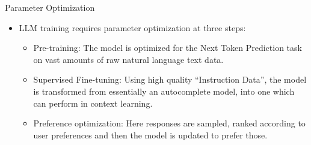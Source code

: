 \documentclass{beamer}
\begin{document}
\begin{frame}{Parameter Optimization}
    \begin{itemize}
        \item LLM training requires parameter optimization at three steps:
        \vspace{0.5em}
        \begin{itemize}
            \item Pre-training: The model is optimized for the Next Token Prediction task on vast amounts of raw natural language text data.
            \vspace{0.5em}
            \item Supervised Fine-tuning: Using high quality “Instruction Data”, the model is transformed from essentially an autocomplete model, into one which can perform in context learning.
            \vspace{0.5em}
            \item Preference optimization: Here responses are sampled, ranked according to user preferences and then the model is updated to prefer those.
        \end{itemize}
    \end{itemize}
\end{frame}
\end{document}

